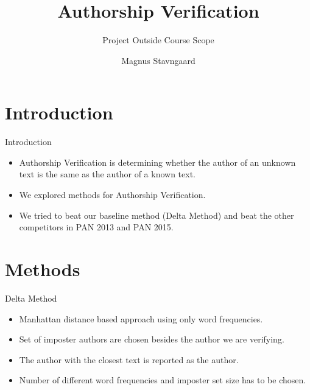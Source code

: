 \documentclass[10pt]{beamer}
\title{Authorship Verification}
\subtitle{Project Outside Course Scope}
\date{}
\author{Magnus Stavngaard}
\institute{University of Copenhagen}
\begin{document}
\maketitle


\section{Introduction}

\begin{frame}[fragile]{Introduction}

    \begin{itemize}
        \item Authorship Verification is determining whether the author of an
            unknown text is the same as the author of a known text.
        \item We explored methods for Authorship Verification.
        \item We tried to beat our baseline method (Delta Method) and beat the
            other competitors in PAN 2013 and PAN 2015.
    \end{itemize}

\end{frame}

\section{Methods}

\begin{frame}[fragile]{Delta Method}

    \begin{itemize}
        \item Manhattan distance based approach using only word frequencies.
        \item Set of imposter authors are chosen besides the author we are
            verifying.
        \item The author with the closest text is reported as the author.
        \item Number of different word frequencies and imposter set size has to
            be chosen.
    \end{itemize}

\end{frame}
\end{document}
